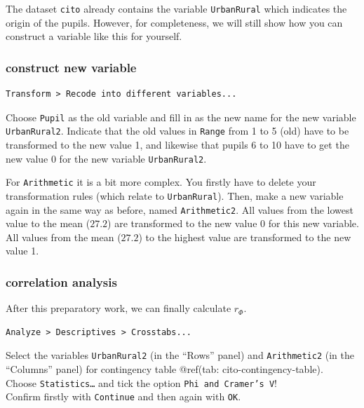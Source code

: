 \documentclass[
]{book}
\begin{document}
The dataset \texttt{cito} already contains the variable \texttt{UrbanRural} which indicates the
origin of the pupils. However, for completeness, we will still show how you can
construct a variable like this for yourself.

\hypertarget{construct-new-variable}{%
\subsubsection{construct new variable}\label{construct-new-variable}}

\begin{verbatim}
Transform > Recode into different variables...
\end{verbatim}

Choose \texttt{Pupil} as the old variable and fill in as the new name for the new variable
\texttt{UrbanRural2}. Indicate that the old values in \texttt{Range} from
1 to 5 (old) have to be transformed to the new value 1, and likewise that
pupils 6 to 10 have to get the new value 0 for the new variable
\texttt{UrbanRural2}.

For \texttt{Arithmetic} it is a bit more complex. You firstly have to delete
your transformation rules (which relate to \texttt{UrbanRural}). Then, make a new variable
again in the same way as before, named \texttt{Arithmetic2}.
All values from the lowest value to the mean (\(27.2\)) are transformed to the
new value 0 for this new variable. All values
from the mean (\(27.2\)) to the highest value are transformed to the new value 1.

\hypertarget{correlation-analysis}{%
\subsubsection{correlation analysis}\label{correlation-analysis}}

After this preparatory work, we can finally calculate \(r_\Phi\).

\begin{verbatim}
Analyze > Descriptives > Crosstabs...
\end{verbatim}

Select the variables \texttt{UrbanRural2} (in the ``Rows'' panel) and \texttt{Arithmetic2}
(in the ``Columns'' panel) for
contingency table @ref(tab: cito-contingency-table).\\
Choose \texttt{Statistics\ldots{}} and tick the option \texttt{Phi\ and\ Cramer’s\ V}!\\
Confirm firstly with \texttt{Continue} and then again with \texttt{OK}.
\end{document}
